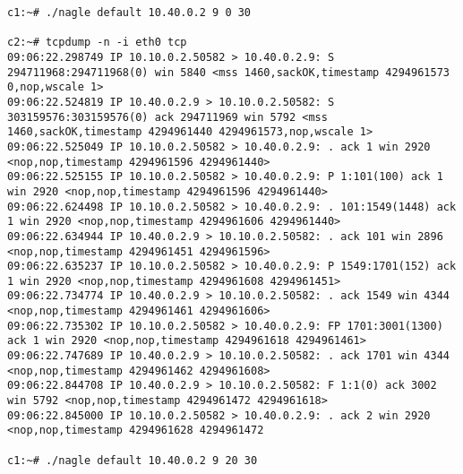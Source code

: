 \documentclass[a4paper,12pt]{article}
\begin{document}
\begin{Verbatim}
c1:~# ./nagle default 10.40.0.2 9 0 30

c2:~# tcpdump -n -i eth0 tcp
09:06:22.298749 IP 10.10.0.2.50582 > 10.40.0.2.9: S 294711968:294711968(0) win 5840 <mss 1460,sackOK,timestamp 4294961573 0,nop,wscale 1>
09:06:22.524819 IP 10.40.0.2.9 > 10.10.0.2.50582: S 303159576:303159576(0) ack 294711969 win 5792 <mss 1460,sackOK,timestamp 4294961440 4294961573,nop,wscale 1>
09:06:22.525049 IP 10.10.0.2.50582 > 10.40.0.2.9: . ack 1 win 2920 <nop,nop,timestamp 4294961596 4294961440>
09:06:22.525155 IP 10.10.0.2.50582 > 10.40.0.2.9: P 1:101(100) ack 1 win 2920 <nop,nop,timestamp 4294961596 4294961440>
09:06:22.624498 IP 10.10.0.2.50582 > 10.40.0.2.9: . 101:1549(1448) ack 1 win 2920 <nop,nop,timestamp 4294961606 4294961440>
09:06:22.634944 IP 10.40.0.2.9 > 10.10.0.2.50582: . ack 101 win 2896 <nop,nop,timestamp 4294961451 4294961596>
09:06:22.635237 IP 10.10.0.2.50582 > 10.40.0.2.9: P 1549:1701(152) ack 1 win 2920 <nop,nop,timestamp 4294961608 4294961451>
09:06:22.734774 IP 10.40.0.2.9 > 10.10.0.2.50582: . ack 1549 win 4344 <nop,nop,timestamp 4294961461 4294961606>
09:06:22.735302 IP 10.10.0.2.50582 > 10.40.0.2.9: FP 1701:3001(1300) ack 1 win 2920 <nop,nop,timestamp 4294961618 4294961461>
09:06:22.747689 IP 10.40.0.2.9 > 10.10.0.2.50582: . ack 1701 win 4344 <nop,nop,timestamp 4294961462 4294961608>
09:06:22.844708 IP 10.40.0.2.9 > 10.10.0.2.50582: F 1:1(0) ack 3002 win 5792 <nop,nop,timestamp 4294961472 4294961618>
09:06:22.845000 IP 10.10.0.2.50582 > 10.40.0.2.9: . ack 2 win 2920 <nop,nop,timestamp 4294961628 4294961472

c1:~# ./nagle default 10.40.0.2 9 20 30


\end{Verbatim}
\end{document}
